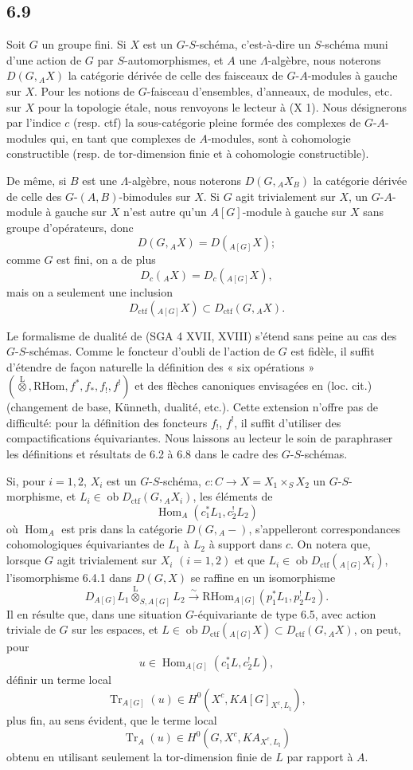 \documentclass[11pt]{article}
\DeclareMathOperator{\Hom}{Hom}
\providecommand{\RHom}{\mathrm{RHom}}
\providecommand{\Tr}{\operatorname{Tr}}
\providecommand{\Tr}{\operatorname{Tr}}
\providecommand{\lten}{\overset{\mathrm L}{\otimes}}
\providecommand{\Ob}{\operatorname{ob}}
\providecommand{\Tr}{\operatorname{Tr}}
\providecommand{\RHom}{\mathrm{RHom}}
\providecommand{\Hom}{\operatorname{Hom}}
\providecommand{\lten}{\overset{\mathrm L}{\otimes}}
\providecommand{\RHom}{\mathrm R\mathcal{H}om}
\providecommand{\lten}{\overset{\mathrm L}{\otimes}}
\providecommand{\Ob}{\operatorname{ob}}
\providecommand{\Tr}{\operatorname{Tr}}
\providecommand{\lten}{\overset{\mathrm L}{\otimes}}
\providecommand{\lten}{\overset{\mathrm L}{\otimes}}
\providecommand{\Ob}{\operatorname{Ob}}
\providecommand{\lten}{\overset{\mathrm L}{\otimes}}
\begin{document}
\subsection*{6.9}
Soit $G$ un groupe fini. Si $X$ est un $G$-$S$-schéma, c'est-à-dire un $S$-schéma muni d'une action de $G$ par $S$-automorphismes, et $A$ une $\Lambda$-algèbre, nous noterons $D(G,{}_AX)$ la catégorie dérivée de celle des faisceaux de $G$-$A$-modules à gauche sur $X$. Pour les notions de $G$-faisceau d'ensembles, d'anneaux, de modules, etc. sur $X$ pour la topologie étale, nous renvoyons le lecteur à (X 1). Nous désignerons par l'indice $c$ (resp. ctf) la sous-catégorie pleine formée des complexes de $G$-$A$-modules qui, en tant que complexes de $A$-modules, sont à cohomologie constructible (resp. de tor-dimension finie et à cohomologie constructible).

De même, si $B$ est une $\Lambda$-algèbre, nous noterons $D(G,{}_AX_B)$ la catégorie dérivée de celle des $G$-$(A,B)$-bimodules sur $X$. Si $G$ agit trivialement sur $X$, un $G$-$A$-module à gauche sur $X$ n'est autre qu'un $A[G]$-module à gauche sur $X$ sans groupe d'opérateurs, donc
\[
D(G,{}_AX)=D({}_{A[G]}X);
\]
comme $G$ est fini, on a de plus
\[
D_c({}_AX)=D_c({}_{A[G]}X),
\]
mais on a seulement une inclusion
\[
D_{\mathrm{ctf}}({}_{A[G]}X)\subset D_{\mathrm{ctf}}(G,{}_AX).
\]

Le formalisme de dualité de (SGA 4 XVII, XVIII) s'étend sans peine au cas des $G$-$S$-schémas. Comme le foncteur d'oubli de l'action de $G$ est fidèle, il suffit d'étendre de façon naturelle la définition des « six opérations » $(\lten,\RHom,f^*,f_*,f_!,f^!)$ et des flèches canoniques envisagées en (loc. cit.) (changement de base, Künneth, dualité, etc.). Cette extension n'offre pas de difficulté: pour la définition des foncteurs $f_!$, $f^!$, il suffit d'utiliser des compactifications équivariantes. Nous laissons au lecteur le soin de paraphraser les définitions et résultats de 6.2 à 6.8 dans le cadre des $G$-$S$-schémas.

Si, pour $i=1,2$, $X_i$ est un $G$-$S$-schéma, $c:C\to X=X_1\times_SX_2$ un $G$-$S$-morphisme, et $L_i\in\Ob D_{\mathrm{ctf}}(G,{}_AX_i)$, les éléments de
\[
\Hom_A(c_1^*L_1,c_2^!L_2)
\]
où $\Hom_A$ est pris dans la catégorie $D(G,{}_A-)$, s'appelleront correspondances cohomologiques équivariantes de $L_1$ à $L_2$ à support dans $c$. On notera que, lorsque $G$ agit trivialement sur $X_i$ $(i=1,2)$ et que $L_i\in\Ob D_{\mathrm{ctf}}({}_{A[G]}X_i)$, l'isomorphisme 6.4.1 dans $D(G,X)$ se raffine en un isomorphisme
\[
D_{A[G]}L_1\lten_{S,A[G]}L_2
\xrightarrow{\sim}
\RHom_{A[G]}(p_1^*L_1,p_2^!L_2).
\]
Il en résulte que, dans une situation $G$-équivariante de type 6.5, avec action triviale de $G$ sur les espaces, et $L\in\Ob D_{\mathrm{ctf}}({}_{A[G]}X)\subset D_{\mathrm{ctf}}(G,{}_AX)$, on peut, pour
\[
u\in\Hom_{A[G]}(c_1^*L,c_2^!L),
\]
définir un terme local
\[
\Tr_{A[G]}(u)\in H^0(X^c,KA[G]_{X^c,L_{\natural}}),
\]
plus fin, au sens évident, que le terme local
\[
\Tr_A(u)\in H^0(G,X^c,KA_{X^c,L_{\natural}})
\]
obtenu en utilisant seulement la tor-dimension finie de $L$ par rapport à $A$.
\end{document}
